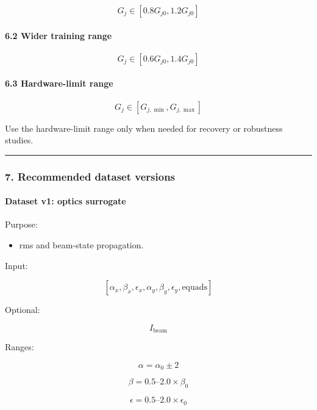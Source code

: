 \documentclass[
]{article}
\providecommand{\tightlist}{%
  \setlength{\itemsep}{0pt}\setlength{\parskip}{0pt}}
\begin{document}
\[
G_j \in [0.8G_{j0},1.2G_{j0}]
\]

\hypertarget{wider-training-range}{%
\paragraph{6.2 Wider training range}\label{wider-training-range}}

\[
G_j \in [0.6G_{j0},1.4G_{j0}]
\]

\hypertarget{hardware-limit-range}{%
\paragraph{6.3 Hardware-limit range}\label{hardware-limit-range}}

\[
G_j \in [G_{j,\min},G_{j,\max}]
\]

Use the hardware-limit range only when needed for recovery or robustness
studies.

\begin{center}\rule{0.5\linewidth}{0.5pt}\end{center}

\hypertarget{recommended-dataset-versions}{%
\subsubsection{7. Recommended dataset
versions}\label{recommended-dataset-versions}}

\hypertarget{dataset-v1-optics-surrogate}{%
\paragraph{Dataset v1: optics
surrogate}\label{dataset-v1-optics-surrogate}}

Purpose:

\begin{itemize}
\tightlist
\item
  rms and beam-state propagation.
\end{itemize}

Input:

\[
[
\alpha_x,\beta_x,\epsilon_x,
\alpha_y,\beta_y,\epsilon_y,
\mathrm{equads}
]
\]

Optional:

\[
I_{\mathrm{beam}}
\]

Ranges:

\[
\alpha = \alpha_0\pm 2
\]

\[
\beta = 0.5\text{--}2.0\times\beta_0
\]

\[
\epsilon = 0.5\text{--}2.0\times\epsilon_0
\]
\end{document}

